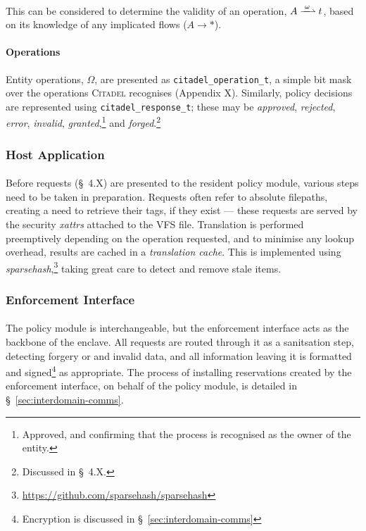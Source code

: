 \paragraph{} This can be considered to determine the validity of an operation, $A \xrightharpoonup{\;\omega\;} t$, based on its knowledge of any implicated flows ($A \rightarrow *$).

\paragraph{Operations} Entity operations, $\Omega$, are presented as \texttt{citadel\_operation\_t}, a simple bit mask over the operations \textsc{Citadel} recognises (Appendix X). Similarly, policy decisions are represented using \texttt{citadel\_response\_t}; these may be \textit{approved}, \textit{rejected}, \textit{error}, \textit{invalid}, \textit{granted},\footnote{Approved, and confirming that the process is recognised as the owner of the entity.} and \textit{forged}.\footnote{Discussed in §~4.X.}


\subsubsection{Host Application}
\paragraph{} Before requests (§~4.X) are presented to the resident policy module, various steps need to be taken in preparation. Requests often refer to absolute filepaths, creating a need to retrieve their tags, if they exist --- these requests are served by the security \textit{xattrs} attached to the VFS file. Translation is performed preemptively depending on the operation requested, and to minimise any lookup overhead, results are cached in a \textit{translation cache}. This is implemented using \textit{sparsehash},\footnote{\url{https://github.com/sparsehash/sparsehash}} taking great care to detect and remove stale items.


\subsubsection{Enforcement Interface}
\paragraph{} The policy module is interchangeable, but the enforcement interface acts as the backbone of the enclave. All requests are routed through it as a sanitsation step, detecting forgery or and invalid data, and all information leaving it is formatted and signed\footnote{Encryption is discussed in §~\ref{sec:interdomain-comms}} as appropriate. The process of installing reservations created by the enforcement interface, on behalf of the policy module, is detailed in §~\ref{sec:interdomain-comms}.

